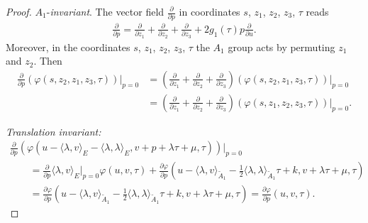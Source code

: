 \documentclass[pdftex]{sigma}%
\numberwithin{equation}{section}
\begin{document}
\begin{proof}
$A_1$-\emph{invariant}.
The vector field $\frac{\partial}{\partial p}$ in coordinates $s$, $z_1$, $z_2$, $z_3$, $\tau$ reads
\begin{gather*}
\frac{\partial}{\partial p}=\frac{\partial}{\partial z_1}+\frac{\partial}{\partial z_2}+\frac{\partial}{\partial z_3}+2g_1(\tau)p\frac{\partial}{\partial u}.
\end{gather*}
Moreover, in the coordinates $s$, $z_1$, $z_2$, $z_3$, $\tau$ the $A_1$ group acts by permuting $z_1$ and $z_2$. Then
\begin{align*}
\frac{\partial}{\partial p}(\varphi(s,z_2,z_1,z_3,\tau))\bigg|_{p=0} &=\left(\frac{\partial}{\partial z_1}+\frac{\partial}{\partial z_2}+\frac{\partial}{\partial z_3}\right)( \varphi(s,z_2,z_1,z_3,\tau))\bigg|_{p=0}
\\
&=\left(\frac{\partial}{\partial z_1}+\frac{\partial}{\partial z_2}+\frac{\partial}{\partial z_3}\right) ( \varphi(s,z_1,z_2,z_3,\tau))\bigg|_{p=0}.
\end{align*}

\emph{Translation invariant:}
\begin{gather*}
\frac{\partial}{\partial p}\left(\varphi(u-\langle \lambda, v\rangle_E-\langle \lambda,\lambda \rangle_E,v+p+\lambda\tau+\mu,\tau)\right)\bigg |_{p=0}
\\ \qquad
{}=\frac{\partial}{\partial p} \langle \lambda, v\rangle_E \bigg |_{p=0}\varphi(u,v,\tau)+\frac{\partial \varphi}{\partial p}\left(u-\langle \lambda,v \rangle_{\tilde A_1}-\frac{1}{2}\langle \lambda,\lambda \rangle_{\tilde A_1}\tau+k,v+\lambda\tau+\mu,\tau\right)
\\ \qquad
{}=\frac{\partial \varphi}{\partial p}\left(u-\langle \lambda,v \rangle_{\tilde A_1}-\frac{1}{2}\langle \lambda,\lambda \rangle_{\tilde A_1}\tau+k,v+\lambda\tau+\mu,\tau\right)
=\frac{\partial \varphi}{\partial p}(u,v,\tau).
\end{gather*}


\end{proof}
\end{document}
